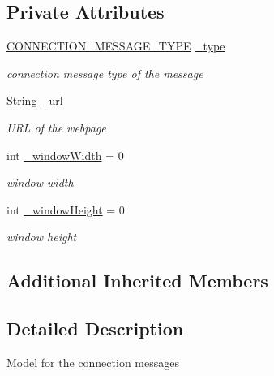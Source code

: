 \subsection*{Private Attributes}
\begin{DoxyCompactItemize}
\item 
\hyperlink{class_web_analyzer_1_1_models_1_1_message_model_1_1_connection_message_a0b8ebc456d3aed9c51235f2a1a1a1cdb}{C\+O\+N\+N\+E\+C\+T\+I\+O\+N\+\_\+\+M\+E\+S\+S\+A\+G\+E\+\_\+\+T\+Y\+P\+E} \hyperlink{class_web_analyzer_1_1_models_1_1_message_model_1_1_connection_message_abb086bc753b39762aede8191821e72cb}{\+\_\+type}
\begin{DoxyCompactList}\small\item\em connection message type of the message \end{DoxyCompactList}\item 
String \hyperlink{class_web_analyzer_1_1_models_1_1_message_model_1_1_connection_message_a8b546b2299ebc28fbe93f158a7e1742a}{\+\_\+url}
\begin{DoxyCompactList}\small\item\em U\+R\+L of the webpage \end{DoxyCompactList}\item 
int \hyperlink{class_web_analyzer_1_1_models_1_1_message_model_1_1_connection_message_a0dd807c1966d8e6d90b0e764eacca950}{\+\_\+window\+Width} = 0
\begin{DoxyCompactList}\small\item\em window width \end{DoxyCompactList}\item 
int \hyperlink{class_web_analyzer_1_1_models_1_1_message_model_1_1_connection_message_a9a2326a089eb048ce429e3bcceb54918}{\+\_\+window\+Height} = 0
\begin{DoxyCompactList}\small\item\em window height \end{DoxyCompactList}\end{DoxyCompactItemize}
\subsection*{Additional Inherited Members}


\subsection{Detailed Description}
Model for the connection messages 




